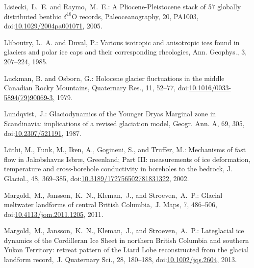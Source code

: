 \documentclass[tc, manuscript]{copernicus}
\begin{document}
\begin{thebibliography}{114}
Lisiecki,~L.~E. and Raymo,~M.~E.: A Pliocene-Pleistocene stack of 57 globally distributed benthic $\delta^{18}$O records, Paleoceanography, 20, PA1003,
doi:\href{http://dx.doi.org/10.1029/2004pa001071}{10.1029/2004pa001071}, 2005.


Lliboutry, L.~A. and Duval, P.: Various isotropic and anisotropic ices found in glaciers and polar ice caps and their corresponding rheologies, Ann. Geophys., 3, 207--224, 1985.


Luckman, B. and Osborn, G.: Holocene glacier fluctuations in the middle Canadian Rocky Mountains, Quaternary Res., 11, 52--77,
doi:\href{http://dx.doi.org/10.1016/0033-5894(79)90069-3}{10.1016/0033-5894(79)90069-3}, 1979.


Lundqvist,~J.: Glaciodynamics of the Younger Dryas Marginal zone in Scandinavia: implications of a revised glaciation model, Geogr. Ann. A, 69, 305,
doi:\href{http://dx.doi.org/10.2307/521191}{10.2307/521191}, 1987.


L{\"u}thi, M., Funk, M., Iken, A., Gogineni, S., and Truffer, M.: Mechanisms of fast flow in {J}akobshavns {I}sbr{\ae}, {G}reenland; {P}art {III}: measurements of ice deformation, temperature and cross-borehole conductivity in boreholes to the bedrock, J. Glaciol., 48, 369--385,
doi:\href{http://dx.doi.org/10.3189/172756502781831322}{10.3189/172756502781831322}, 2002.


Margold,~M., Jansson,~K.~N., Kleman,~J., and Stroeven,~A.~P.: Glacial meltwater landforms of central British Columbia,~J. Maps, 7, 486--506,
doi:\href{http://dx.doi.org/10.4113/jom.2011.1205}{10.4113/jom.2011.1205}, 2011.


Margold,~M., Jansson,~K.~N., Kleman,~J., and Stroeven,~A.~P.: Lateglacial ice dynamics of the Cordilleran Ice Sheet in northern British Columbia and southern Yukon Territory: retreat pattern of the Liard Lobe reconstructed from the glacial landform record,~J. Quaternary Sci., 28, 180--188,
doi:\href{http://dx.doi.org/10.1002/jqs.2604}{10.1002/jqs.2604}, 2013{}.



\end{thebibliography}
\end{document}
